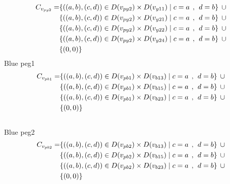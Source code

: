 \begin{align*}
C_{v_{py2}} = &\{((a,b),(c,d))\in D(v_{py2}) \times D(v_{y11})\mid c = a \hspace{1ex} , \hspace{1ex}  d = b\} \hspace{1ex} \cup 
\\& \{((a,b),(c,d))\in D(v_{py2}) \times D(v_{y21})\mid c = a \hspace{1ex} , \hspace{1ex}  d = b\} \hspace{1ex} \cup 
\\& \{ ((a,b),(c,d))\in D(v_{py2}) \times D(v_{y22})\mid c = a \hspace{1ex} , \hspace{1ex}  d = b\} \hspace{1ex} \cup 
\\&\{((a,b),(c,d))\in D(v_{py2}) \times D(v_{y24})\mid c = a \hspace{1ex} , \hspace{1ex}  d = b\} \hspace{1ex}\cup
\\& \{(0,0)\}
\end{align*}
 Blue peg1 
\begin{align*}
C_{v_{pb1}} = &\{((a,b),(c,d))\in D(v_{pb1}) \times D(v_{b13})\mid c = a \hspace{1ex} , \hspace{1ex}  d = b\} \hspace{1ex} \cup 
\\& \{((a,b),(c,d))\in D(v_{pb1}) \times D(v_{b15})\mid c = a \hspace{1ex} , \hspace{1ex}  d = b\} \hspace{1ex} \cup 
\\& \{ ((a,b),(c,d))\in D(v_{pb1}) \times D(v_{b23})\mid c = a \hspace{1ex} , \hspace{1ex}  d = b\} \hspace{1ex} \cup 
\\& \{(0,0)\}
\end{align*}
\\ Blue peg2
\begin{align*}
C_{v_{pb2}} = &\{((a,b),(c,d))\in D(v_{pb2}) \times D(v_{b13})\mid c = a \hspace{1ex} , \hspace{1ex}  d = b\} \hspace{1ex} \cup \\& \{((a,b),(c,d))\in D(v_{pb2}) \times D(v_{b15})\mid c = a \hspace{1ex} , \hspace{1ex}  d = b\} \hspace{1ex} \cup \\& \{ ((a,b),(c,d))\in D(v_{pb2}) \times D(v_{b23})\mid c = a \hspace{1ex} , \hspace{1ex}  d = b\} \hspace{1ex} \cup \\& \{(0,0)\}
\end{align*}
